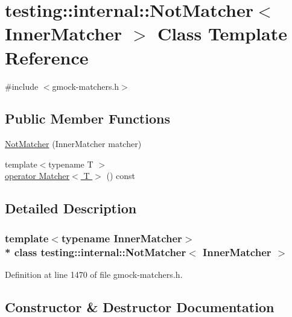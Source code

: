 \hypertarget{classtesting_1_1internal_1_1_not_matcher}{}\section{testing\+:\+:internal\+:\+:Not\+Matcher$<$ Inner\+Matcher $>$ Class Template Reference}
\label{classtesting_1_1internal_1_1_not_matcher}


{\ttfamily \#include $<$gmock-\/matchers.\+h$>$}

\subsection*{Public Member Functions}
\begin{DoxyCompactItemize}
\item 
\hyperlink{classtesting_1_1internal_1_1_not_matcher_a77bd397c9974e4e49acb84eeb624dce1}{Not\+Matcher} (Inner\+Matcher matcher)
\item 
{\footnotesize template$<$typename T $>$ }\\\hyperlink{classtesting_1_1internal_1_1_not_matcher_a041ad31e94163d5d6f575fae9f0f1a7c}{operator Matcher$<$ T $>$} () const 
\end{DoxyCompactItemize}


\subsection{Detailed Description}
\subsubsection*{template$<$typename Inner\+Matcher$>$\\*
class testing\+::internal\+::\+Not\+Matcher$<$ Inner\+Matcher $>$}



Definition at line 1470 of file gmock-\/matchers.\+h.



\subsection{Constructor \& Destructor Documentation}
